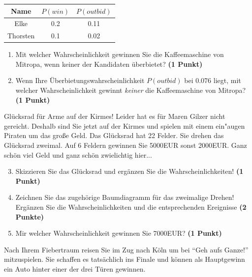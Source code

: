 \documentclass[a4paper, 9pt]{scrartcl}\usepackage[]{graphicx}\usepackage[]{xcolor}
\begin{document}
\begin{center}
\begin{tabular}{ccc}
  \toprule
  Name & $P(win)$ & $P(outbid)$\\
  \midrule
  Elke & 0.2 & 0.11\\
  Thorsten & 0.1 & 0.02 \\
  \bottomrule
\end{tabular}
\end{center}

\begin{enumerate}
\item Mit welcher Wahrscheinlichkeit gewinnen Sie die Kaffeemaschine von
  Mitropa, wenn keiner der Kandidaten {\"u}berbietet? \textbf{(1 Punkt)}
\item Wenn Ihre {\"U}berbietungswahrscheinlichkeit $P(outbid)$ bei
  0.076 liegt, mit welcher Wahrscheinlichkeit gewinnt
  \textit{keiner} die Kaffeemaschine von Mitropa? \textbf{(1 Punkt)}
\end{enumerate}

Gl{\"u}cksrad f{\"u}r Arme auf der Kirmes! Leider hat es f{\"u}r Maren Gilzer nicht
gereicht. Deshalb sind Sie jetzt auf der Kirmes und spielen mit
einem ein{"a}ugen Piraten um das gro{\ss}e Geld. Das Gl{\"u}cksrad hat 22
Felder. Sie drehen das Gl{\"u}cksrad zweimal. Auf 6 Feldern
gewinnen Sie 5000EUR sonst 2000EUR. Ganz sch{\"o}n viel Geld
und ganz sch{\"o}n zwielichtig hier...

\begin{enumerate}
  \setcounter{enumi}{2}  
\item Skizzieren Sie das Gl{\"u}cksrad und erg{\"a}nzen Sie die
  Wahrscheinlichkeiten! \textbf{(1 Punkt)}
\item Zeichnen Sie das zugeh{\"o}rige Baumdiagramm f{\"u}r das zweimalige Drehen!
  Erg{\"a}nzen Sie die Wahrscheinlichkeiten und die entsprechenden Ereignisse
  \textbf{(2 Punkte)}
\item Mir welcher Wahrscheinlichkeit gewinnen Sie 7000EUR? \textbf{(1
    Punkt)}
\end{enumerate}

Nach Ihrem Fiebertraum reisen Sie im Zug nach K{\"o}ln um bei "`Geh aufs
Ganze!"' mitzuspielen. Sie schaffen es tats{\"a}chlich ins Finale und k{\"o}nnen
als Hauptgewinn ein Auto hinter einer der drei T{\"u}ren gewinnen. 
\end{document}
